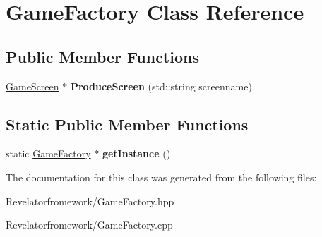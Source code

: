 \hypertarget{class_game_factory}{\section{Game\-Factory Class Reference}
\label{class_game_factory}
}
\subsection*{Public Member Functions}
\begin{DoxyCompactItemize}
\item 
\hypertarget{class_game_factory_ad293f5a8811d9106753916cef819fbce}{\hyperlink{class_game_screen}{Game\-Screen} $\ast$ {\bfseries Produce\-Screen} (std\-::string screenname)}\label{class_game_factory_ad293f5a8811d9106753916cef819fbce}

\end{DoxyCompactItemize}
\subsection*{Static Public Member Functions}
\begin{DoxyCompactItemize}
\item 
\hypertarget{class_game_factory_af9b8ebc6daa14822ec704480afbc8494}{static \hyperlink{class_game_factory}{Game\-Factory} $\ast$ {\bfseries get\-Instance} ()}\label{class_game_factory_af9b8ebc6daa14822ec704480afbc8494}

\end{DoxyCompactItemize}


The documentation for this class was generated from the following files\-:\begin{DoxyCompactItemize}
\item 
Revelatorfromework/Game\-Factory.\-hpp\item 
Revelatorfromework/Game\-Factory.\-cpp\end{DoxyCompactItemize}
